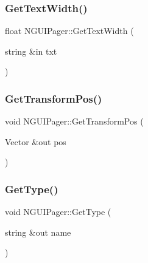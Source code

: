\hypertarget{class_n_g_u_i_pager_a74d6a7719b103fef8e0991bc8d2fe75f}{}\label{class_n_g_u_i_pager_a74d6a7719b103fef8e0991bc8d2fe75f} 
\subsubsection{\texorpdfstring{Get\+Text\+Width()}{GetTextWidth()}}
{\footnotesize\ttfamily float N\+G\+U\+I\+Pager\+::\+Get\+Text\+Width (\begin{DoxyParamCaption}\item[{string \&in}]{txt }\end{DoxyParamCaption})}

\hypertarget{class_n_g_u_i_pager_ae433a93241f12cd90a325399d577adf2}{}\label{class_n_g_u_i_pager_ae433a93241f12cd90a325399d577adf2} 
\subsubsection{\texorpdfstring{Get\+Transform\+Pos()}{GetTransformPos()}}
{\footnotesize\ttfamily void N\+G\+U\+I\+Pager\+::\+Get\+Transform\+Pos (\begin{DoxyParamCaption}\item[{Vector \&out}]{pos }\end{DoxyParamCaption})}

\hypertarget{class_n_g_u_i_pager_a211de9f5d76da42aa29c59740c180014}{}\label{class_n_g_u_i_pager_a211de9f5d76da42aa29c59740c180014} 
\subsubsection{\texorpdfstring{Get\+Type()}{GetType()}}
{\footnotesize\ttfamily void N\+G\+U\+I\+Pager\+::\+Get\+Type (\begin{DoxyParamCaption}\item[{string \&out}]{name }\end{DoxyParamCaption})}

\hypertarget{class_n_g_u_i_pager_ab725f94a842b6874d0f14ed8026ec2d4}{}\label{class_n_g_u_i_pager_ab725f94a842b6874d0f14ed8026ec2d4} 

